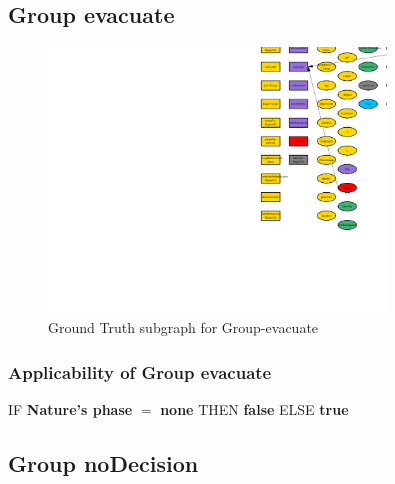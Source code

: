 \documentclass{article}%
\begin{document}
%
\subsection{Group evacuate}%
\label{subsec:Group evacuate}%


\begin{figure}[ht]%
\centering%
\includegraphics[width=0.8\textwidth]{images/Group-evacuate.png}%
\caption{Ground Truth subgraph for Group{-}evacuate}%
\end{figure}

%
\subsubsection{Applicability of Group evacuate}%
\label{ssubsec:Applicability of Group evacuate}%
\begin{flushleft}%
IF %
\textbf{Nature's phase}%
$=$%
\textbf{none}%
\linebreak%
\hspace*{2em}%
THEN %
\textbf{false}%
\linebreak%
\hspace*{2em}%
ELSE %
\textbf{true}%
\end{flushleft}

%
\subsection{Group noDecision}%
\label{subsec:Group noDecision}%
\end{document}
